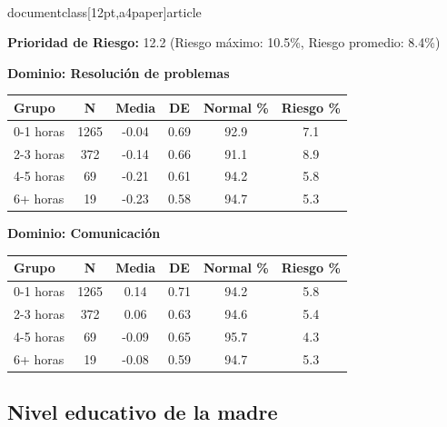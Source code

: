 \\documentclass[12pt,a4paper]{article}
\begin{document}
\textbf{Prioridad de Riesgo:} 12.2 (Riesgo máximo: 10.5\%, Riesgo promedio: 8.4\%)


\vspace{0.5cm}


\textbf{Dominio: Resolución de problemas}


\begin{center}
\begin{tabular}{|l|c|c|c|c|c|}
\hline
\textbf{Grupo} & \textbf{N} & \textbf{Media} & \textbf{DE} & \textbf{Normal \%} & \textbf{Riesgo \%} \\
\hline
0-1 horas & 1265 & -0.04 & 0.69 & 92.9 & 7.1 \\
2-3 horas & 372 & -0.14 & 0.66 & 91.1 & 8.9 \\
4-5 horas & 69 & -0.21 & 0.61 & 94.2 & 5.8 \\
6+ horas & 19 & -0.23 & 0.58 & 94.7 & 5.3 \\

\hline
\end{tabular}
\end{center}


\vspace{0.5cm}


\textbf{Dominio: Comunicación}


\begin{center}
\begin{tabular}{|l|c|c|c|c|c|}
\hline
\textbf{Grupo} & \textbf{N} & \textbf{Media} & \textbf{DE} & \textbf{Normal \%} & \textbf{Riesgo \%} \\
\hline
0-1 horas & 1265 & 0.14 & 0.71 & 94.2 & 5.8 \\
2-3 horas & 372 & 0.06 & 0.63 & 94.6 & 5.4 \\
4-5 horas & 69 & -0.09 & 0.65 & 95.7 & 4.3 \\
6+ horas & 19 & -0.08 & 0.59 & 94.7 & 5.3 \\

\hline
\end{tabular}
\end{center}


\vspace{0.5cm}


\subsection{Nivel educativo de la madre}
\end{document}
